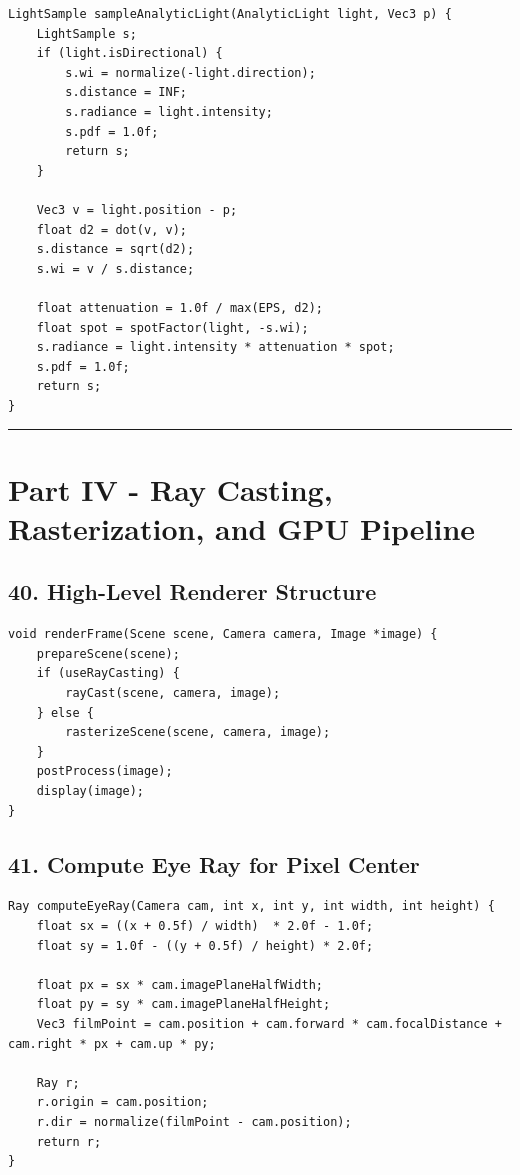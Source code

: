 \documentclass[10pt,letterpaper]{article}
\begin{document}
\begin{verbatim}
LightSample sampleAnalyticLight(AnalyticLight light, Vec3 p) {
    LightSample s;
    if (light.isDirectional) {
        s.wi = normalize(-light.direction);
        s.distance = INF;
        s.radiance = light.intensity;
        s.pdf = 1.0f;
        return s;
    }

    Vec3 v = light.position - p;
    float d2 = dot(v, v);
    s.distance = sqrt(d2);
    s.wi = v / s.distance;

    float attenuation = 1.0f / max(EPS, d2);
    float spot = spotFactor(light, -s.wi);
    s.radiance = light.intensity * attenuation * spot;
    s.pdf = 1.0f;
    return s;
}
\end{verbatim}

\medskip\hrule\medskip

\clearpage
\section{Part IV - Ray Casting, Rasterization, and GPU Pipeline}

\subsection{40. High-Level Renderer Structure}

\begin{verbatim}
void renderFrame(Scene scene, Camera camera, Image *image) {
    prepareScene(scene);
    if (useRayCasting) {
        rayCast(scene, camera, image);
    } else {
        rasterizeScene(scene, camera, image);
    }
    postProcess(image);
    display(image);
}
\end{verbatim}

\subsection{41. Compute Eye Ray for Pixel Center}

\begin{verbatim}
Ray computeEyeRay(Camera cam, int x, int y, int width, int height) {
    float sx = ((x + 0.5f) / width)  * 2.0f - 1.0f;
    float sy = 1.0f - ((y + 0.5f) / height) * 2.0f;

    float px = sx * cam.imagePlaneHalfWidth;
    float py = sy * cam.imagePlaneHalfHeight;
    Vec3 filmPoint = cam.position + cam.forward * cam.focalDistance + cam.right * px + cam.up * py;

    Ray r;
    r.origin = cam.position;
    r.dir = normalize(filmPoint - cam.position);
    return r;
}
\end{verbatim}
\end{document}
